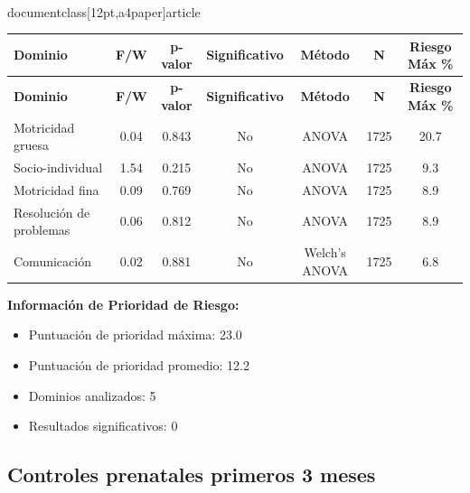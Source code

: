 \\documentclass[12pt,a4paper]{article}
\begin{document}
\begin{longtable}{|l|c|c|c|c|c|c|}
\hline
\textbf{Dominio} & \textbf{F/W} & \textbf{p-valor} & \textbf{Significativo} & \textbf{Método} & \textbf{N} & \textbf{Riesgo Máx \%} \\
\hline
\endfirsthead

\hline
\textbf{Dominio} & \textbf{F/W} & \textbf{p-valor} & \textbf{Significativo} & \textbf{Método} & \textbf{N} & \textbf{Riesgo Máx \%} \\
\hline
\endhead

\hline
\endfoot

\hline
\endlastfoot

Motricidad gruesa & 0.04 & 0.843 & No & ANOVA & 1725 & 20.7 \\
Socio-individual & 1.54 & 0.215 & No & ANOVA & 1725 & 9.3 \\
Motricidad fina & 0.09 & 0.769 & No & ANOVA & 1725 & 8.9 \\
Resolución de problemas & 0.06 & 0.812 & No & ANOVA & 1725 & 8.9 \\
Comunicación & 0.02 & 0.881 & No & Welch's ANOVA & 1725 & 6.8 \\

\end{longtable}


\textbf{Información de Prioridad de Riesgo:}
\begin{itemize}
\item Puntuación de prioridad máxima: 23.0
\item Puntuación de prioridad promedio: 12.2
\item Dominios analizados: 5
\item Resultados significativos: 0
\end{itemize}


\subsection{Controles prenatales primeros 3 meses}
\end{document}
